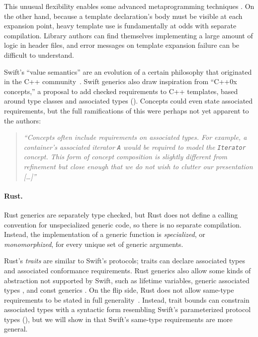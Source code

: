 \documentclass[../generics]{subfiles}
\begin{document}
This unusual flexibility enables some advanced metaprogramming techniques \cite{gregor}. On the other hand, because a template declaration's body must be visible at each expansion point, heavy template use is fundamentally at odds with separate compilation. Library authors can find themselves implementing a large amount of logic in header files, and error messages on template expansion failure can be difficult to understand.

Swift's ``value semantics'' are an evolution of a certain philosophy that originated in the C++ community~\cite{stepanov}. Swift generics also draw inspiration from ``C++0x concepts,'' a proposal to add checked requirements to C++ templates, based around type classes and associated types (\cite{concepts,essential}). Concepts could even state associated requirements, but the full ramifications of this were perhaps not yet apparent to the authors:
\begin{quote}
\textsl{``Concepts often include requirements on associated types. For example, a container's associated iterator \texttt{A} would be required to model the \texttt{Iterator} concept. This form of concept composition is slightly different from refinement but close enough that we do not wish to clutter our presentation [\ldots]''}
\end{quote}

\paragraph{Rust.}
Rust generics are separately type checked, but Rust does not define a calling convention for unspecialized generic code, so there is no separate compilation. Instead, the implementation of a generic function is \emph{specialized}, or \emph{monomorphized}, for every unique set of generic arguments.

Rust's \emph{traits} are similar to Swift's protocols; traits can declare associated types and associated conformance requirements. Rust generics also allow some kinds of abstraction not supported by Swift, such as lifetime variables, generic associated types \cite{rust_gat}, and const generics \cite{rust_const}. On the flip side, Rust does not allow same-type requirements to be stated in full generality~\cite{rust_same}. Instead, trait bounds can constrain associated types with a syntactic form resembling Swift's parameterized protocol types (), but we will show in  that Swift's same-type requirements are more general.
\end{document}
